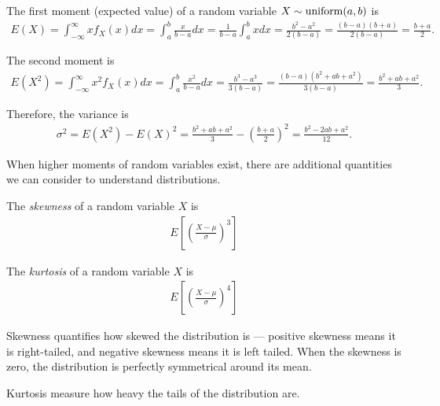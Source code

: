\begin{defn}
    The first moment (expected value) of a random variable $X \sim \mathrm{uniform}(a, b)$ is
    \begin{align*}
        E(X) = \int_{-\infty}^{\infty}xf_X(x)dx = \int_{a}^{b}\frac{x}{b - a}dx = \frac{1}{b - a}\int_{a}^{b}xdx = \frac{b^2 - a^2}{2(b - a)} = \frac{(b - a)(b + a)}{2(b - a)} = \frac{b+a}{2}.
    \end{align*}

    The second moment is
    \begin{align*}
        E(X^2) = \int_{-\infty}^{\infty}x^2f_X(x)dx = \int_{a}^{b}\frac{x^2}{b - a}dx = \frac{b^3 - a^3}{3(b - a)} = \frac{(b-a)(b^2 + ab + a^2)}{3(b - a)} = \frac{b^2+ab+a^2}{3}.
    \end{align*}

    Therefore, the variance is
    \begin{align*}
        \sigma^2 = E(X^2) - E(X)^2 = \frac{b^2+ab+a^2}{3} - \left(\frac{b+a}{2}\right)^2 = \frac{b^2-2ab+a^2}{12}.
    \end{align*}
\end{defn}

\begin{rmk}
    When higher moments of random variables exist, there are additional quantities we can consider to understand distributions.
\end{rmk}

\begin{defn}
    The \emph{skewness} of a random variable $X$ is
    \begin{align*}
        E\left[\left(\frac{X-\mu}{\sigma}\right)^3\right]
    \end{align*}
\end{defn}

\begin{defn}
    The \emph{kurtosis} of a random variable $X$ is
    \begin{align*}
        E\left[\left(\frac{X-\mu}{\sigma}\right)^4\right]
    \end{align*}
\end{defn}

\begin{rmk}
    Skewness quantifies how skewed the distribution is --- positive skewness means it is right-tailed, and negative skewness means it is left tailed. When the skewness is zero, the distribution is perfectly symmetrical around its mean.

    Kurtosis measure how heavy the tails of the distribution are.
\end{rmk}

